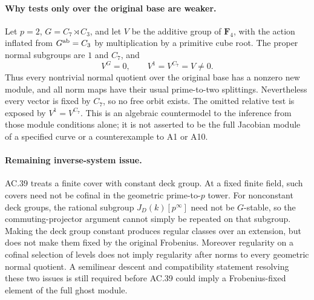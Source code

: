 \paragraph{Why tests only over the original base are weaker.}
Let \(p=2\), \(G=C_7\rtimes C_3\), and let \(V\) be
the additive group of \(\mathbf F_4\), with the action
inflated from \(G^{\rm ab}=C_3\) by multiplication by
a primitive cube root. The proper normal subgroups
are \(1\) and \(C_7\), and
\[
                     V^G=0,\qquad
                     V^1=V^{C_7}=V\ne0.
\]
Thus every nontrivial normal quotient over the original
base has a nonzero new module, and all norm maps have
their usual prime-to-two splittings. Nevertheless every
vector is fixed by \(C_7\), so no free orbit exists.
The omitted relative test is exposed by
\(V^1=V^{C_7}\). This is an algebraic countermodel to
the inference from those module conditions alone;
it is not asserted to be the full Jacobian module of
a specified curve or a counterexample to A1 or A10.

\paragraph{Remaining inverse-system issue.}
AC.39 treats a finite cover with constant deck group.
At a fixed finite field, such covers need not be
cofinal in the geometric prime-to-\(p\) tower.
For nonconstant deck groups, the rational subgroup
\(J_D(k)[p^\infty]\) need not be \(G\)-stable, so the
commuting-projector argument cannot simply be repeated
on that subgroup. Making the deck group constant
produces regular classes over an extension, but does
not make them fixed by the original Frobenius.
Moreover regularity on a cofinal selection of levels
does not imply regularity after norms to every
geometric normal quotient. A semilinear descent and
compatibility statement resolving these two issues
is still required before AC.39 could imply a
Frobenius-fixed element of the full ghost module.

